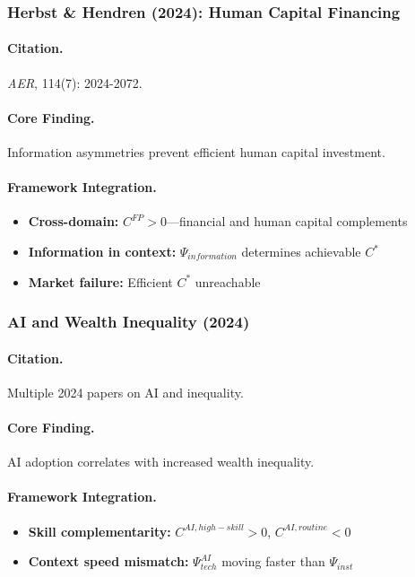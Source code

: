 \documentclass[12pt,a4paper]{article}
\begin{document}
\subsubsection{Herbst \& Hendren (2024): Human Capital Financing}

\paragraph{Citation.}
\emph{AER}, 114(7): 2024-2072.

\paragraph{Core Finding.}
Information asymmetries prevent efficient human capital investment.

\paragraph{Framework Integration.}
\begin{itemize}
  \item \textbf{Cross-domain:} $C^{FP} > 0$---financial and human capital complements
  \item \textbf{Information in context:} $\Psi_{information}$ determines achievable $C^*$
  \item \textbf{Market failure:} Efficient $C^*$ unreachable
\end{itemize}

\subsubsection{AI and Wealth Inequality (2024)}

\paragraph{Citation.}
Multiple 2024 papers on AI and inequality.

\paragraph{Core Finding.}
AI adoption correlates with increased wealth inequality.

\paragraph{Framework Integration.}
\begin{itemize}
  \item \textbf{Skill complementarity:} $C^{AI,high-skill} > 0$, $C^{AI,routine} < 0$
  \item \textbf{Context speed mismatch:} $\Psi_{tech}^{AI}$ moving faster than $\Psi_{inst}$
\end{itemize}
\end{document}
